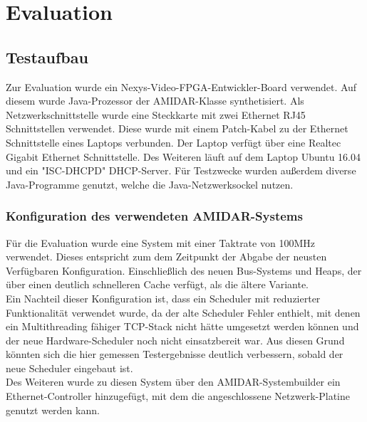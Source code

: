 \chapter{Evaluation}


\section{Testaufbau}

Zur Evaluation wurde ein Nexys-Video-FPGA-Entwickler-Board verwendet. Auf diesem wurde Java-Prozessor der AMIDAR-Klasse synthetisiert. Als Netzwerkschnittstelle wurde eine Steckkarte mit zwei Ethernet RJ45 Schnittstellen verwendet. Diese wurde mit einem Patch-Kabel zu der Ethernet Schnittstelle eines Laptops verbunden. Der Laptop verfügt über eine Realtec Gigabit Ethernet Schnittstelle. Des Weiteren läuft auf dem Laptop Ubuntu 16.04 und ein "{}ISC-DHCPD"{} DHCP-Server. Für Testzwecke wurden außerdem diverse Java-Programme genutzt, welche die Java-Netzwerksockel nutzen. 

\subsection{Konfiguration des verwendeten AMIDAR-Systems}
Für die Evaluation wurde eine System mit einer Taktrate von 100MHz verwendet. Dieses entspricht zum dem Zeitpunkt der Abgabe der neusten Verfügbaren Konfiguration. Einschließlich des neuen Bus-Systems und Heaps, der über einen deutlich schnelleren Cache verfügt, als die ältere Variante. \\
Ein Nachteil dieser Konfiguration ist, dass ein Scheduler mit reduzierter Funktionalität verwendet wurde, da der alte Scheduler Fehler enthielt, mit denen ein Multithreading fähiger TCP-Stack nicht hätte umgesetzt werden können und der neue Hardware-Scheduler noch nicht einsatzbereit war. Aus diesen Grund könnten sich die hier gemessen Testergebnisse deutlich verbessern, sobald der neue Scheduler eingebaut ist. \\
Des Weiteren wurde zu diesen System über den AMIDAR-Systembuilder ein Ethernet-Controller hinzugefügt, mit dem die angeschlossene Netzwerk-Platine genutzt werden kann.


